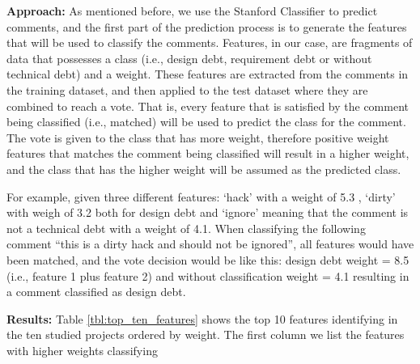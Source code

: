 \vspace{1mm}
\noindent \textbf{Approach:} As mentioned before, we use the Stanford Classifier to predict \SATD comments, and the first part of the prediction process is to generate the features that will be used to classify the comments. Features, in our case, are fragments of data that possesses a class (i.e., design debt, requirement debt or without technical debt) and a weight. These features are extracted from the comments in the training dataset, and then applied to the test dataset where they are combined to reach a vote. That is, every feature that is satisfied by the comment being classified (i.e., matched) will be used to predict the class for the comment. The vote is given to the class that has more weight, therefore positive weight features that matches the comment being classified will result in a higher weight, and the class that has the higher weight will be assumed as the predicted class.


For example, given three different features: `hack' with a weight of 5.3 , `dirty' with weigh of 3.2 both for design debt and `ignore' meaning that the comment is not a technical debt with a weight of 4.1. When classifying the following comment ``this is a dirty hack and should not be ignored'', all features would have been matched, and the vote decision would be like this: design debt weight = 8.5 (i.e., feature 1 plus feature 2) and without classification weight = 4.1 resulting in a comment classified as  design debt.

\vspace{1mm}
\noindent \textbf{Results:} Table \ref{tbl:top_ten_features} shows the top 10 features identifying \SATD in the ten studied projects ordered by weight. The first column we list the features with higher weights classifying  

